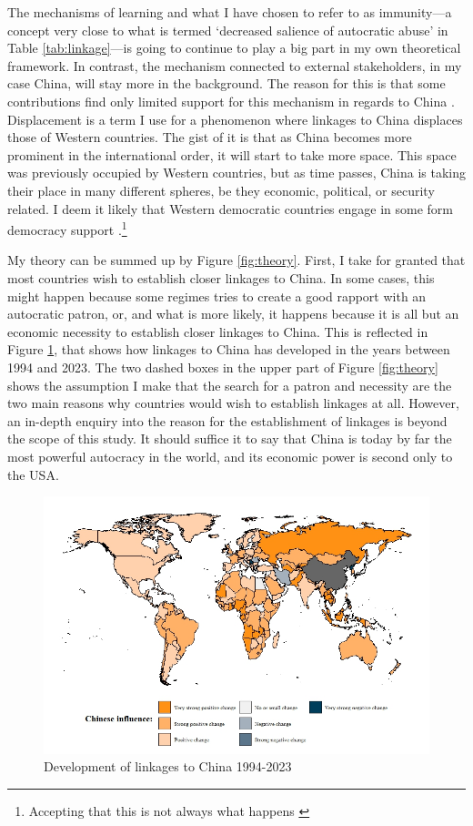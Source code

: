 The mechanisms of learning and what I have chosen to refer to as immunity---a concept very close to what is termed `decreased salience of autocratic abuse' in Table \ref{tab:linkage}---is going to continue to play a big part in my own theoretical framework. In contrast, the mechanism connected to external stakeholders, in my case China, will stay more in the background. The reason for this is that some contributions find only limited support for this mechanism in regards to China \citep{chen_democracy_2015}. Displacement is a term I use for a phenomenon where linkages to China displaces those of Western countries. The gist of it is that as China becomes more prominent in the international order, it will start to take more space. This space was previously occupied by Western countries, but as time passes, China is taking their place in many different spheres, be they economic, political, or security related. I deem it likely that Western democratic countries engage in some form democracy support \citep{levitsky_linkage_2006}.\footnote{Accepting that this is not always what happens \citep{chen_democracy_2015, wong_chinese_2019}} 

My theory can be summed up by Figure \ref{fig:theory}. First, I take for granted that most countries wish to establish closer linkages to China. In some cases, this might happen because some regimes tries to create a good rapport with an autocratic patron, or, and what is more likely, it happens because it is all but an economic necessity to establish closer linkages to China. This is reflected in Figure \ref{fig:link-china}, that shows how linkages to China has developed in the years between 1994 and 2023. The two dashed boxes in the upper part of Figure \ref{fig:theory} shows the assumption I make that the search for a patron and necessity are the two main reasons why countries would wish to establish linkages at all. However, an in-depth enquiry into the reason for the establishment of linkages is beyond the scope of this study. It should suffice it to say that China is today by far the most powerful autocracy in the world, and its economic power is second only to the USA. 

\begin{figure}
    \centering
    \includegraphics[width=\linewidth]{graphics/chinese_influence.jpeg}
    \caption{Development of linkages to China 1994-2023}
    \label{fig:link-china}
\end{figure}

